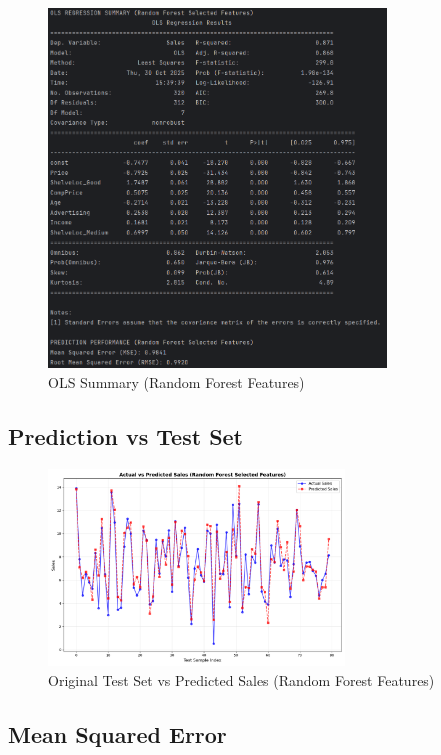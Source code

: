 \documentclass[12pt]{article}
\begin{document}
\begin{figure}[H]
    \centering
    \includegraphics[width=0.8\textwidth]{images/ols_summary_rf.png}
    \caption{OLS Summary (Random Forest Features)}
    \label{fig:rf_ols_summary}
\end{figure}

\subsection{Prediction vs Test Set}

\begin{figure}[H]
    \centering
    \includegraphics[width=0.7\textwidth]{images/rf_model_performance.png}
    \caption{Original Test Set vs Predicted Sales (Random Forest Features)}
    \label{fig:rf_prediction}
\end{figure}

\subsection{Mean Squared Error}
\end{document}
